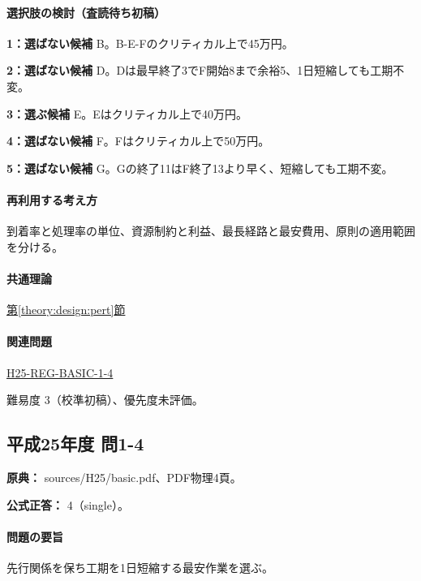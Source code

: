 \paragraph{選択肢の検討（査読待ち初稿）}\mbox{}\par

\noindent\textbf{1：選ばない候補} B。B-E-Fのクリティカル上で45万円。\par

\noindent\textbf{2：選ばない候補} D。Dは最早終了3でF開始8まで余裕5、1日短縮しても工期不変。\par

\noindent\textbf{3：選ぶ候補} E。Eはクリティカル上で40万円。\par

\noindent\textbf{4：選ばない候補} F。Fはクリティカル上で50万円。\par

\noindent\textbf{5：選ばない候補} G。Gの終了11はF終了13より早く、短縮しても工期不変。\par

\paragraph{再利用する考え方} 到着率と処理率の単位、資源制約と利益、最長経路と最安費用、原則の適用範囲を分ける。

\paragraph{共通理論} \hyperref[theory:design:pert]{第\ref*{theory:design:pert}節}

\paragraph{関連問題} \hyperref[q:h25-reg-basic-1-4]{H25-REG-BASIC-1-4}

\par 難易度 3（校準初稿）、優先度未評価。

\subsection{平成25年度 問1-4}
\label{q:h25-reg-basic-1-4}

\noindent\textbf{原典：} sources/H25/basic.pdf、PDF物理4頁。

\textbf{公式正答：} 4（single）。

\paragraph{問題の要旨} 先行関係を保ち工期を1日短縮する最安作業を選ぶ。

